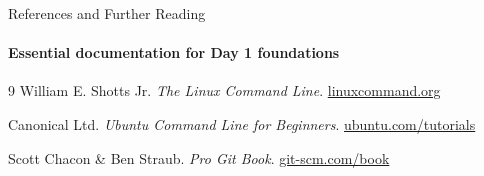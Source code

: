 \begin{frame}{References and Further Reading}
\framesubtitle{Essential documentation for Day 1 foundations}

            \begin{thebibliography}{9}
                 William E. Shotts Jr.
                \newblock \emph{The Linux Command Line}.
                \newblock \href{https://linuxcommand.org/}{\color{um6p-color-dark-blue}linuxcommand.org}

                 Canonical Ltd.
                \newblock \emph{Ubuntu Command Line for Beginners}.
                \newblock \href{https://ubuntu.com/tutorials/command-line-for-beginners}{\color{um6p-color-dark-blue}ubuntu.com/tutorials}

                 Scott Chacon \& Ben Straub.
                \newblock \emph{Pro Git Book}.
                \newblock \href{https://git-scm.com/book/en/v2}{\color{um6p-color-dark-blue}git-scm.com/book}
            \end{thebibliography}
\end{frame}



